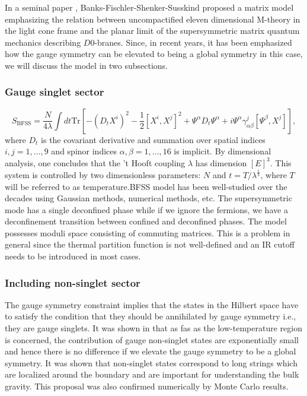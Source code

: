 \documentclass[11pt]{article}
\begin{document}
In a seminal paper \cite{Banks:1996vh}, Banks-Fischler-Shenker-Susskind proposed a matrix model emphasizing the relation between uncompactified eleven dimensional M-theory in the light cone frame and the planar limit of the supersymmetric matrix quantum mechanics describing $D0$-branes. Since, in recent years, it has been emphasized how the gauge symmetry can be elevated to being a global symmetry in this case, we will discuss the model in two subsections. 


\subsubsection{Gauge singlet sector}

\begin{equation}
	S_{\text{BFSS}}=\frac{N}{4\lambda} \int dt \mbox{Tr} \left[
	-(D_t X^i)^2 - \frac{1}{2} \left[X^i,X^j\right]^2 +  \Psi^\alpha D_t \Psi^\alpha + i \Psi^\alpha \gamma_{\alpha \beta}^j [\Psi^\beta,X^j]
	\right],
	\label{D0action}
\end{equation}
where $D_t$ is the covariant derivative and summation over spatial indices 
$i,j=1,\dots,9$ and  spinor indices $\alpha,\beta=1,\dots,16$ is implicit. By dimensional analysis, one concludes that the 't Hooft coupling $\lambda$ has dimension $[E]^3$. This system is controlled by two dimensionless parameters: $N$ and $ t=T/\lambda^{\frac{1}{3}}$, where $T$ will be referred to as temperature.BFSS model has been well-studied over the decades using Gaussian methods, numerical methods, etc. The supersymmetric mode has a single deconfined phase while if we ignore the fermions, we have a deconfinement transition between confined and deconfined phases. The model possesses moduli space consisting of commuting matrices. This is a problem in general since the thermal partition function is not well-defined and an IR cutoff needs to be introduced in most cases. 





\subsubsection{Including non-singlet sector}


The gauge symmetry constraint implies that the states in the Hilbert space have to satisfy the condition that they should be annihilated by gauge symmetry i.e., they are gauge singlets. It was shown in that as fas as the low-temperature region is concerned, the contribution of gauge non-singlet states are exponentially small and hence there is no difference if we elevate the gauge symmetry to be a global symmetry. It was shown that non-singlet states correspond to long strings which are localized around the boundary and are important for understanding the bulk gravity. This proposal was also confirmed numerically by Monte Carlo results. 
\end{document}
